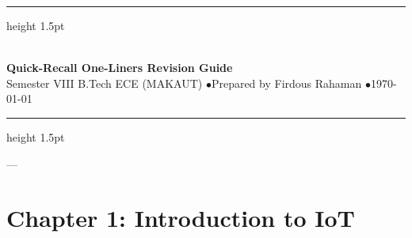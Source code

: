 \documentclass[11pt,a4paper]{article}
\begin{document}
\begin{center}
  \vspace*{-0.3in}
  {\hrule height 1.5pt} \vspace{0.25cm}
  {\Huge\bfseries\color{darkblue}} \\[0.2cm]
  {\Large\bfseries\color{secondary}\sffamily Quick-Recall One-Liners Revision Guide} \\[0.25cm]
  {\small\sffamily\color{secondary} Semester VIII B.Tech ECE (MAKAUT) \quad$\bullet$\quad Prepared by Firdous Rahaman \quad$\bullet$\quad \today} \\[0.2cm]
  {\hrule height 1.5pt}
  \vspace{1.0em}
\end{center}
\thispagestyle{plain}


---

\section*{Chapter 1: Introduction to IoT}
\end{document}
